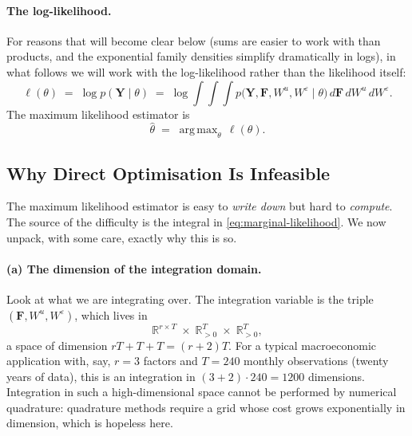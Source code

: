 \documentclass[11pt, a4paper, oneside]{article}
\DeclareMathOperator*{\argmax}{arg\,max}
\newcommand{\mY}{\mathbf{Y}}
\newcommand{\mF}{\mathbf{F}}
\begin{document}
\paragraph{The log-likelihood.}
For reasons that will become clear below (sums are easier to work with
than products, and the exponential family densities simplify dramatically
in logs), in what follows we will work with the log-likelihood rather
than the likelihood itself:
\[
\ell(\theta) \;=\; \log p(\mY \mid \theta)
\;=\; \log \int\!\int\!\int
p\big(\mY, \mF, W^u, W^\varepsilon \mid \theta\big)\,
d\mF\, dW^u\, dW^\varepsilon.
\]
The maximum likelihood estimator is
\[
\hat{\theta} \;=\; \argmax_{\theta}\, \ell(\theta).
\]

\subsection{Why Direct Optimisation Is Infeasible}

The maximum likelihood estimator is easy to \emph{write down} but hard
to \emph{compute}. The source of the difficulty is the integral in
\eqref{eq:marginal-likelihood}. We now unpack, with some care, exactly
why this is so.

\paragraph{(a) The dimension of the integration domain.}
Look at what we are integrating over. The integration variable is the
triple $(\mF, W^u, W^\varepsilon)$, which lives in
\[
\mathbb{R}^{r \times T} \;\times\; \mathbb{R}^{T}_{>0} \;\times\; \mathbb{R}^{T}_{>0},
\]
a space of dimension $rT + T + T = (r+2)T$. For a typical macroeconomic
application with, say, $r = 3$ factors and $T = 240$ monthly observations
(twenty years of data), this is an integration in
$(3 + 2) \cdot 240 = 1200$ dimensions. Integration in such a high-dimensional
space cannot be performed by numerical quadrature: quadrature methods
require a grid whose cost grows exponentially in dimension, which is
hopeless here.
\end{document}
